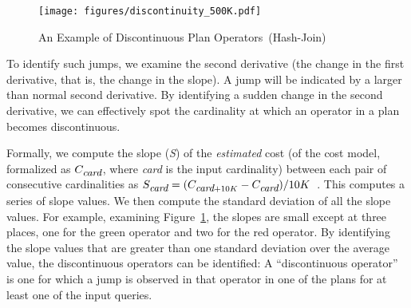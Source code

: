 \documentclass[prodmode,acmtods]{acmsmall}
\begin{document}
\begin{figure}[t]
\centering
\texttt{[image: figures/discontinuity\_500K.pdf]}%
\caption{An Example of Discontinuous Plan \hbox{Operators (Hash-Join)}}
\label{fig:discontinuity}
\end{figure}

To identify such jumps, we examine the second derivative (the change in the
first derivative, that is, the change in the slope). A jump will be indicated by a larger than normal second
derivative. By identifying a sudden change in the second derivative, we can
effectively spot the cardinality at which an operator in a plan becomes
discontinuous.

Formally, we compute the slope ({\em S}) of the {\em estimated} cost
(of the cost model, formalized as $C_{\hbox{\small\em card}}$,
where {\em card} is the input
cardinality) between each pair of consecutive cardinalities as
$S_{\hbox{\small\em card}} = (C_{\hbox{\small\em card} + 10K} -
C_{\hbox{\small\em card}}) / 10K$~.
This computes a series of slope values.
We then compute the standard deviation of all the slope
values.  For example, examining Figure~\ref{fig:discontinuity}, the slopes
are small except at three places, one for the green operator and two for the
red operator. By identifying the slope values that are greater than one
standard deviation over the average value, the discontinuous operators can
be identified: A ``discontinuous operator'' is one for which a jump is
observed in that operator in one of the plans for at least one of the input
queries.
\end{document}
